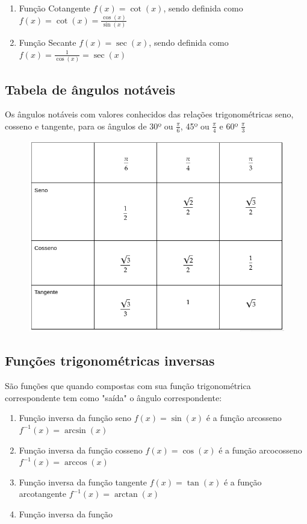 \begin{multicols*}{2}
\begin{enumerate}
        \item Função Cotangente $f(x) = \cot(x)$, sendo definida como
              $f(x) = \cot(x) = \frac{\cos(x)}{\sin(x)}$

        \item Função Secante $f(x) = \sec(x)$, sendo definida como
              $f(x) = \frac{1}{\cos(x)} = \sec(x)$

    \end{enumerate}
    \subsection{Tabela de ângulos notáveis}
    Os ângulos notáveis com valores conhecidos das relações trigonométricas seno, cosseno e tangente, para os ângulos de 30º ou $\frac{\pi}{6}$, 45º ou $\frac{\pi}{4}$ e 60º $\frac{\pi}{3}$
    \begin{figure}[H]
        \centering
        \includegraphics[scale=0.38]{assets/rafael/img36.png}
    \end{figure}

    \subsection{Funções trigonométricas inversas}

    São funções que quando compostas com sua função trigonométrica correspondente tem como "saída" o ângulo correspondente:
    \begin{enumerate}
        \item Função inversa da função seno $f(x) = \sin(x)$ é a função arcosseno $f^{-1}(x) = \arcsin(x)$
        \item Função inversa da função cosseno $f(x) = \cos(x)$ é a função arcocosseno
              $f^{-1}(x) = \arccos(x)$
        \item Função inversa da função tangente $f(x) = \tan(x)$ é a função arcotangente
              $f^{-1}(x) = \arctan(x)$
        \item Função inversa da função
    \end{enumerate}


\end{multicols*}
